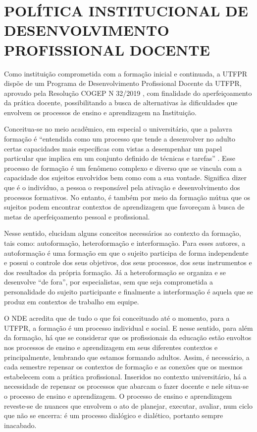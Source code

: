 \chapter{POLÍTICA INSTITUCIONAL DE DESENVOLVIMENTO PROFISSIONAL DOCENTE}

Como instituição comprometida com a formação inicial e continuada, a UTFPR dispõe de um Programa de Desenvolvimento Profissional Docente da UTFPR, aprovado pela Resolução COGEP N\textordmasculine{} 32/2019 \cite{cogep32}, com finalidade do aperfeiçoamento da prática docente, possibilitando a busca de alternativas às dificuldades que envolvem os processos de ensino e aprendizagem na Instituição.

Conceitua-se no meio acadêmico, em especial o universitário, que a palavra formação é ``entendida como um processo que tende a desenvolver no adulto certas capacidades mais específicas com vistas a desempenhar um papel particular que implica em um conjunto definido de técnicas e tarefas'' \cite[p. 25]{vaillant2012ensinando}. Esse processo de formação é um fenômeno complexo e diverso que se vincula com a capacidade dos sujeitos envolvidos bem como com a sua vontade. Significa dizer que é o indivíduo, a pessoa o responsável pela ativação e desenvolvimento dos processos formativos. No entanto, é também por meio da formação mútua que os sujeitos podem encontrar contextos de aprendizagem que favoreçam à busca de metas de aperfeiçoamento pessoal e profissional.

Nesse sentido,  \cite{vaillant2012ensinando} elucidam alguns conceitos necessários ao contexto da formação, tais como: autoformação, heteroformação e interformação. Para esses autores, a autoformação é uma formação em que o sujeito participa de forma independente e possui o controle dos seus objetivos, dos seus processos, dos seus instrumentos e dos resultados da própria formação. Já a heteroformação se organiza e se desenvolve ``de fora'', por especialistas, sem que seja comprometida a personalidade do sujeito participante e finalmente a interformação é aquela que se produz em contextos de trabalho em equipe.

O NDE acredita que de tudo o que foi conceituado até o momento, para a UTFPR, a formação é um processo individual e social. E nesse sentido, para além da formação, há que se considerar que os profissionais da educação estão envoltos nos processos de ensino e aprendizagem em seus diferentes contextos e principalmente, lembrando que estamos formando adultos. Assim, é necessário, a cada semestre repensar os contextos de formação e as conexões que os mesmos estabelecem com a prática profissional. Inseridos no contexto universitário, há a necessidade de repensar os processos que abarcam o fazer docente e nele situa-se o processo de ensino e aprendizagem. O processo de ensino e aprendizagem reveste-se de nuances que envolvem o ato de planejar, executar, avaliar, num ciclo que não se encerra: é um processo dialógico e dialético, portanto sempre inacabado.

